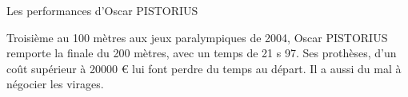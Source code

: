 \begin{doc}
	\caption{Les performances d'Oscar PISTORIUS}
	\label{doc:perfs}
	
	
	\begin{minipage}{0.9\textwidth}
		Troisième au 100 mètres aux jeux paralympiques de 2004, Oscar PISTORIUS remporte la finale du 200 mètres, avec un temps de 21 s 97. Ses prothèses, d'un coût supérieur à \num{20000} € lui font perdre du temps au départ. Il a aussi du mal à négocier les virages.
	\end{minipage}
\end{doc} 